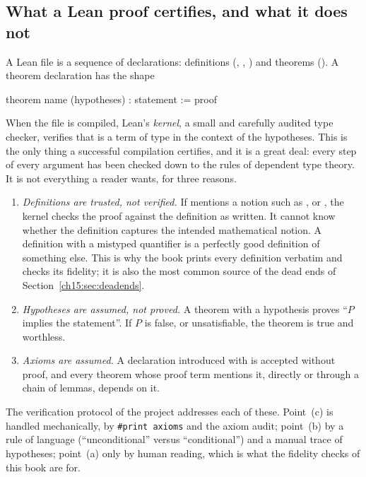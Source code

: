 \subsection{What a Lean proof certifies, and what it does not}\label{ch15:sec:kernel}

A Lean file is a sequence of declarations: definitions (, ,
) and theorems (). A theorem declaration has the shape
\begin{plaincode}
theorem name (hypotheses) : statement := proof
\end{plaincode}
When the file is compiled, Lean's \emph{kernel}, a small and carefully audited type checker,
verifies that  is a term of type  in the context of the hypotheses.
This is the only thing a successful compilation certifies, and it is a great deal: every step of
every argument has been checked down to the rules of dependent type theory. It is not everything a
reader wants, for three reasons.

\begin{enumerate}[label=(\alph*)]
\item \emph{Definitions are trusted, not verified.} If  mentions a notion such as
  ,  or , the kernel checks the
  proof against the definition as written. It cannot know whether the definition captures the
  intended mathematical notion. A definition with a mistyped quantifier is a perfectly good
  definition of something else. This is why the book prints every definition verbatim and checks
  its fidelity; it is also the most common source of the dead ends of
  Section~\ref{ch15:sec:deadends}.
\item \emph{Hypotheses are assumed, not proved.} A theorem with a hypothesis
   proves ``$P$ implies the statement''. If $P$ is false, or unsatisfiable, the
  theorem is true and worthless.
\item \emph{Axioms are assumed.} A declaration introduced with  is accepted without
  proof, and every theorem whose proof term mentions it, directly or through a chain of lemmas,
  depends on it.
\end{enumerate}

The verification protocol of the project addresses each of these. Point~(c) is handled
mechanically, by \texttt{\#print axioms} and the axiom audit; point~(b) by a rule of language
(``unconditional'' versus ``conditional'') and a manual trace of hypotheses; point~(a) only by human
reading, which is what the fidelity checks of this book are for.

